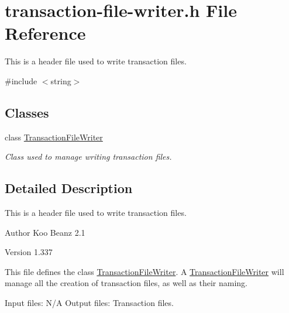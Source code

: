 \hypertarget{transaction-file-writer_8h}{
\section{transaction-\/file-\/writer.h File Reference}
\label{transaction-file-writer_8h}
}


This is a header file used to write transaction files.  


{\ttfamily \#include $<$string$>$}\par
\subsection*{Classes}
\begin{DoxyCompactItemize}
\item 
class \hyperlink{classTransactionFileWriter}{TransactionFileWriter}
\begin{DoxyCompactList}\small\item\em Class used to manage writing transaction files. \item\end{DoxyCompactList}\end{DoxyCompactItemize}


\subsection{Detailed Description}
This is a header file used to write transaction files. \begin{DoxyAuthor}{Author}
Koo Beanz 2.1 
\end{DoxyAuthor}
\begin{DoxyVersion}{Version}
1.337
\end{DoxyVersion}
This file defines the class \hyperlink{classTransactionFileWriter}{TransactionFileWriter}. A \hyperlink{classTransactionFileWriter}{TransactionFileWriter} will manage all the creation of transaction files, as well as their naming.

Input files: N/A Output files: Transaction files. 
